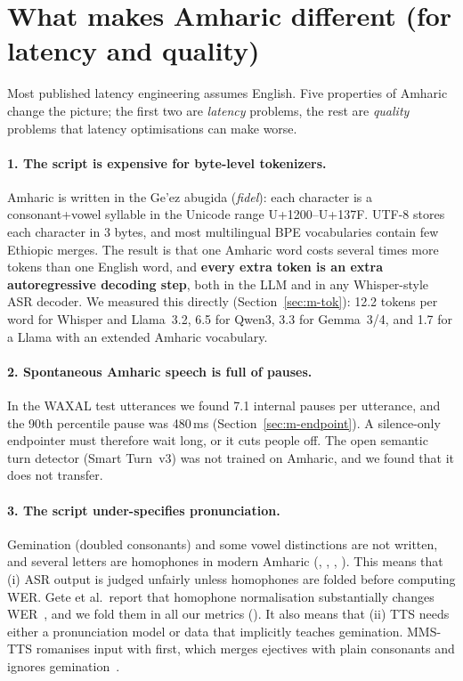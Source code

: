 \section{What makes Amharic different (for latency and quality)}
\label{sec:amharic}

Most published latency engineering assumes English. Five properties of Amharic change the picture;
the first two are \emph{latency} problems, the rest are \emph{quality} problems that latency
optimisations can make worse.

\paragraph{1. The script is expensive for byte-level tokenizers.}
Amharic is written in the Ge'ez abugida (\textit{fidel}): each character is a consonant+vowel
syllable in the Unicode range U+1200–U+137F. UTF-8 stores each character in 3 bytes, and most
multilingual BPE vocabularies contain few Ethiopic merges. The result is that one Amharic word costs
several times more tokens than one English word, and \textbf{every extra token is an extra
autoregressive decoding step}, both in the LLM and in any Whisper-style ASR decoder. We measured this
directly (Section~\ref{sec:m-tok}): 12.2 tokens per word for Whisper and Llama~3.2, 6.5 for Qwen3,
3.3 for Gemma~3/4, and 1.7 for a Llama with an extended Amharic vocabulary.

\paragraph{2. Spontaneous Amharic speech is full of pauses.}
In the WAXAL test utterances we found 7.1 internal pauses per utterance, and the 90th percentile pause
was 480\,ms (Section~\ref{sec:m-endpoint}). A silence-only endpointer must therefore wait long, or it
cuts people off. The open semantic turn detector (Smart Turn~v3) was not trained on Amharic, and we
found that it does not transfer.

\paragraph{3. The script under-specifies pronunciation.}
Gemination (doubled consonants) and some vowel distinctions are not written, and several letters
are homophones in modern Amharic (, , , ). This means that
(i) ASR output is judged unfairly unless homophones are folded before computing WER. Gete et al.\
report that homophone normalisation substantially changes WER~\cite{whisperam}, and we fold them in
all our metrics (\code{smoke/am\_text.py}). It also means that (ii) TTS needs either a pronunciation
model or data that implicitly teaches gemination. MMS-TTS romanises input with \code{uroman} first,
which merges ejectives with plain consonants and ignores gemination~\cite{mms}.

